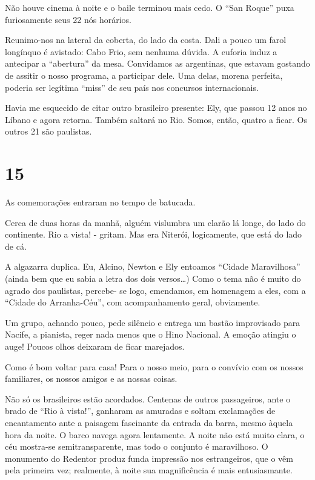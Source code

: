 Não houve cinema à noite e o baile terminou mais cedo. O ``San Roque'' puxa furiosamente seus 22 nós horários.

Reunimo-nos na lateral da coberta, do lado da costa. Dali a pouco um farol longínquo é avistado: Cabo Frio, sem nenhuma dúvida. A euforia induz a antecipar a ``abertura'' da mesa. Convidamos as argentinas, que estavam gostando de assitir o nosso programa, a participar dele. Uma delas, morena perfeita, poderia ser legítima ``miss'' de seu país nos concursos internacionais.

Havia me esquecido de citar outro brasileiro presente: Ely, que passou 12 anos no Líbano e agora retorna. Também saltará no Rio. Somos, então, quatro a ficar. Os outros 21 são paulistas.

\section*{15 \adfflatleafright {}}
As comemorações entraram no tempo de batucada.

Cerca de duas horas da manhã, alguém vislumbra um clarão lá longe, do lado do continente. Rio a vista! - gritam. Mas era Niterói, logicamente, que está do lado de cá.

A algazarra duplica. Eu, Alcino, Newton e Ely entoamos ``Cidade Maravilhosa'' (ainda bem que eu sabia a letra dos dois versos\ldots) Como o tema não é muito do agrado dos paulistas, percebe- se logo, emendamos, em homenagem a eles, com a ``Cidade do Arranha-Céu'', com acompanhamento geral, obviamente.

Um grupo, achando pouco, pede silêncio e entrega um bastão improvisado para Nacife, a pianista, reger nada menos que o Hino Nacional. A emoção atingiu o auge! Poucos olhos deixaram de ficar marejados.

Como é bom voltar para casa! Para o nosso meio, para o convívio com os nossos familiares, os nossos amigos e as nossas coisas.

Não só os brasileiros estão acordados. Centenas de outros passageiros, ante o brado de ``Rio à vista!'', ganharam as amuradas e soltam exclamações de encantamento ante a paisagem fascinante da entrada da barra, mesmo àquela hora da noite. O barco navega agora lentamente. A noite não está muito clara, o céu mostra-se semitransparente, mas todo o conjunto é maravilhoso. O monumento do Redentor produz funda impressão nos estrangeiros, que o vêm pela primeira vez; realmente, à noite sua magnificência é mais entusiasmante.

